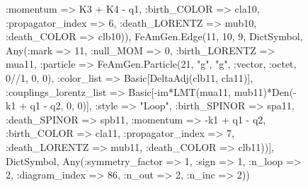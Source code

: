 \documentclass{revtex4}
\begin{document}
\begin{figure}[!htb]
\begin{center}
{:momentum => K3 + K4 - q1, :birth_COLOR => cla10, :propagator_index => 6, :death_LORENTZ => mub10, :death_COLOR => clb10)), FeAmGen.Edge(11, 10, 9, Dict{Symbol, Any}(:mark => 11, :null_MOM => 0, :birth_LORENTZ => mua11, :particle => FeAmGen.Particle(21, "g", "g", :vector, :octet, 0//1, 0, 0), :color_list => Basic[DeltaAdj(clb11, cla11)], :couplings_lorentz_list => Basic[-im*LMT(mua11, mub11)*Den(-k1 + q1 - q2, 0, 0)], :style => "Loop", :birth_SPINOR => spa11, :death_SPINOR => spb11, :momentum => -k1 + q1 - q2, :birth_COLOR => cla11, :propagator_index => 7, :death_LORENTZ => mub11, :death_COLOR => clb11))], Dict{Symbol, Any}(:symmetry_factor => 1, :sign => 1, :n_loop => 2, :diagram_index => 86, :n_out => 2, :n_inc => 2)) 
}
\end{center}
\end{figure}
\end{document}
